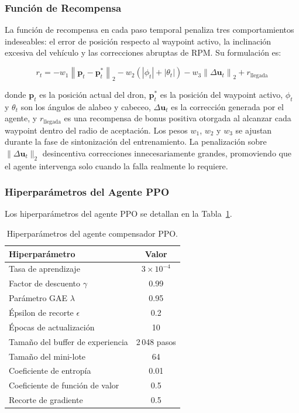 \subsubsection{Función de Recompensa}

La función de recompensa en cada paso temporal penaliza tres comportamientos indeseables: el error de posición respecto al waypoint activo, la inclinación excesiva del vehículo y las correcciones abruptas de RPM. Su formulación es:

\begin{equation}
r_t = -w_1 \left\| \mathbf{p}_t - \mathbf{p}_t^* \right\|_2 - w_2 \left( |\phi_t| + |\theta_t| \right) - w_3 \left\| \Delta\mathbf{u}_t \right\|_2 + r_{\text{llegada}}
\end{equation}

\noindent donde $\mathbf{p}_t$ es la posición actual del dron, $\mathbf{p}_t^*$ es la posición del waypoint activo, $\phi_t$ y $\theta_t$ son los ángulos de alabeo y cabeceo, $\Delta\mathbf{u}_t$ es la corrección generada por el agente, y $r_{\text{llegada}}$ es una recompensa de bonus positiva otorgada al alcanzar cada waypoint dentro del radio de aceptación. Los pesos $w_1$, $w_2$ y $w_3$ se ajustan durante la fase de sintonización del entrenamiento. La penalización sobre $\|\Delta\mathbf{u}_t\|_2$ desincentiva correcciones innecesariamente grandes, promoviendo que el agente intervenga solo cuando la falla realmente lo requiere.

\subsubsection{Hiperparámetros del Agente PPO}

Los hiperparámetros del agente PPO se detallan en la Tabla~\ref{tab:ppo_params}.

\begin{table}[h]
\centering
\caption{Hiperparámetros del agente compensador PPO.}
\label{tab:ppo_params}
\begin{tabular}{lc}
\hline
\textbf{Hiperparámetro} & \textbf{Valor} \\
\hline
Tasa de aprendizaje & $3 \times 10^{-4}$ \\
Factor de descuento $\gamma$ & 0.99 \\
Parámetro GAE $\lambda$ & 0.95 \\
Épsilon de recorte $\epsilon$ & 0.2 \\
Épocas de actualización & 10 \\
Tamaño del buffer de experiencia & 2\,048 pasos \\
Tamaño del mini-lote & 64 \\
Coeficiente de entropía & 0.01 \\
Coeficiente de función de valor & 0.5 \\
Recorte de gradiente & 0.5 \\
\hline
\end{tabular}
\end{table}


